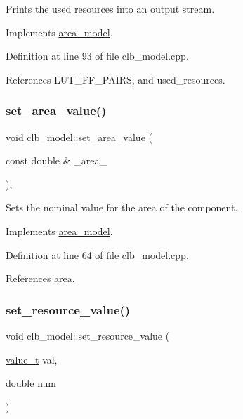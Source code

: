 Prints the used resources into an output stream. 



Implements \hyperlink{classarea__model_abdb74eba19254bd8c2098c006aef673c}{area\+\_\+model}.



Definition at line 93 of file clb\+\_\+model.\+cpp.



References L\+U\+T\+\_\+\+F\+F\+\_\+\+P\+A\+I\+RS, and used\+\_\+resources.

\mbox{\label{classclb__model_ab3e3b52cff76fd2e46d9ac84b83dd456}} 
\subsubsection{\texorpdfstring{set\+\_\+area\+\_\+value()}{set\_area\_value()}}
{\footnotesize\ttfamily void clb\+\_\+model\+::set\+\_\+area\+\_\+value (\begin{DoxyParamCaption}\item[{const double \&}]{\+\_\+area\+\_\+ }\end{DoxyParamCaption})\hspace{0.3cm}{\ttfamily [override]}, {\ttfamily [virtual]}}



Sets the nominal value for the area of the component. 



Implements \hyperlink{classarea__model_a7c533a6a1b352493c04980d0734f89e5}{area\+\_\+model}.



Definition at line 64 of file clb\+\_\+model.\+cpp.



References area.

\mbox{\label{classclb__model_a211bf207a1e3bb6dd4a1ab9d8d2413b4}} 
\subsubsection{\texorpdfstring{set\+\_\+resource\+\_\+value()}{set\_resource\_value()}}
{\footnotesize\ttfamily void clb\+\_\+model\+::set\+\_\+resource\+\_\+value (\begin{DoxyParamCaption}\item[{\hyperlink{classclb__model_a11a81df139e5752535807c276badbe21}{value\+\_\+t}}]{val,  }\item[{double}]{num }\end{DoxyParamCaption})}



